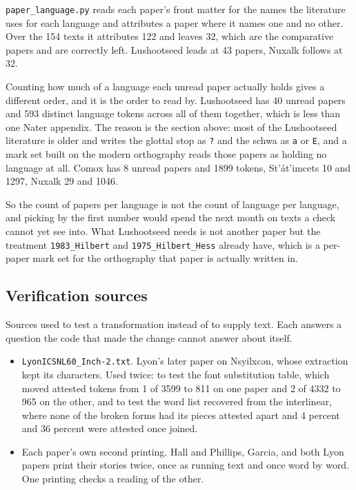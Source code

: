 \texttt{paper\_\allowbreak{}language.\allowbreak{}py} reads each paper's front matter for the names the literature uses for each language and attributes a paper where it names one and no other. Over the 154 texts it attributes 122 and leaves 32, which are the comparative papers and are correctly left. Lushootseed leads at 43 papers, Nuxalk follows at 32.

Counting how much of a language each unread paper actually holds gives a different order, and it is the order to read by. Lushootseed has 40 unread papers and 593 distinct language tokens across all of them together, which is less than one Nater appendix. The reason is the section above: most of the Lushootseed literature is older and writes the glottal stop as \texttt{?} and the schwa as \texttt{a} or \texttt{E}, and a mark set built on the modern orthography reads those papers as holding no language at all. Comox has 8 unread papers and 1899 tokens, St'át'imcets 10 and 1297, Nuxalk 29 and 1046.

So the count of papers per language is not the count of language per language, and picking by the first number would spend the next month on texts a check cannot yet see into. What Lushootseed needs is not another paper but the treatment \texttt{1983\_\allowbreak{}Hilbert} and \texttt{1975\_\allowbreak{}Hilbert\_\allowbreak{}Hess} already have, which is a per-paper mark set for the orthography that paper is actually written in.

\subsection{Verification sources}

Sources used to test a transformation instead of to supply text. Each answers a question the code that made the change cannot answer about itself.

\begin{itemize}
\item \texttt{Lyon\allowbreak{}ICSNL60\_\allowbreak{}Inch-\allowbreak{}2.\allowbreak{}txt}. Lyon's later paper on Nsyilxcən, whose extraction kept its characters. Used twice: to test the font substitution table, which moved attested tokens from 1 of 3599 to 811 on one paper and 2 of 4332 to 965 on the other, and to test the word list recovered from the interlinear, where none of the broken forms had its pieces attested apart and 4 percent and 36 percent were attested once joined.
\item Each paper's own second printing. Hall and Phillips, Garcia, and both Lyon papers print their stories twice, once as running text and once word by word. One printing checks a reading of the other.
\end{itemize}

